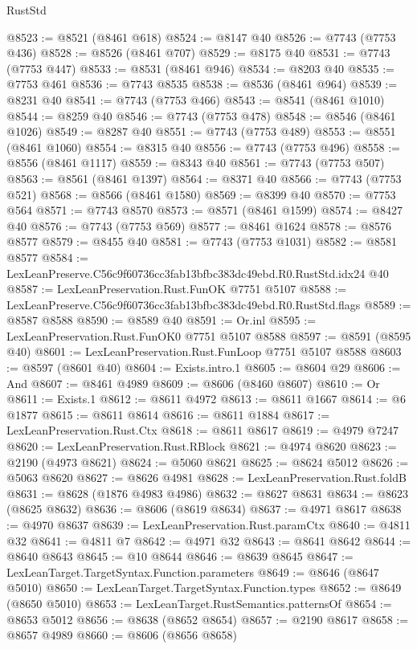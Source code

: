 \begin{lexlean}{RustStd}
\begin{coremodule}
@8523 := @8521 (@8461 @618)
@8524 := @8147 @40
@8526 := @7743 (@7753 @436)
@8528 := @8526 (@8461 @707)
@8529 := @8175 @40
@8531 := @7743 (@7753 @447)
@8533 := @8531 (@8461 @946)
@8534 := @8203 @40
@8535 := @7753 @461
@8536 := @7743 @8535
@8538 := @8536 (@8461 @964)
@8539 := @8231 @40
@8541 := @7743 (@7753 @466)
@8543 := @8541 (@8461 @1010)
@8544 := @8259 @40
@8546 := @7743 (@7753 @478)
@8548 := @8546 (@8461 @1026)
@8549 := @8287 @40
@8551 := @7743 (@7753 @489)
@8553 := @8551 (@8461 @1060)
@8554 := @8315 @40
@8556 := @7743 (@7753 @496)
@8558 := @8556 (@8461 @1117)
@8559 := @8343 @40
@8561 := @7743 (@7753 @507)
@8563 := @8561 (@8461 @1397)
@8564 := @8371 @40
@8566 := @7743 (@7753 @521)
@8568 := @8566 (@8461 @1580)
@8569 := @8399 @40
@8570 := @7753 @564
@8571 := @7743 @8570
@8573 := @8571 (@8461 @1599)
@8574 := @8427 @40
@8576 := @7743 (@7753 @569)
@8577 := @8461 @1624
@8578 := @8576 @8577
@8579 := @8455 @40
@8581 := @7743 (@7753 @1031)
@8582 := @8581 @8577
@8584 := LexLeanPreserve.C56c9f60736cc3fab13bfbc383dc49ebd.R0.RustStd.idx24 @40
@8587 := LexLeanPreservation.Rust.FunOK @7751 @5107
@8588 := LexLeanPreserve.C56c9f60736cc3fab13bfbc383dc49ebd.R0.RustStd.flags
@8589 := @8587 @8588
@8590 := @8589 @40
@8591 := Or.inl
@8595 := LexLeanPreservation.Rust.FunOK0 @7751 @5107 @8588
@8597 := @8591 (@8595 @40)
@8601 := LexLeanPreservation.Rust.FunLoop @7751 @5107 @8588
@8603 := @8597 (@8601 @40)
@8604 := Exists.intro.{1}
@8605 := @8604 @29
@8606 := And
@8607 := @8461 @4989
@8609 := @8606 (@8460 @8607)
@8610 := Or
@8611 := Exists.{1}
@8612 := @8611 @4972
@8613 := @8611 @1667
@8614 := @6 @1877
@8615 := @8611 @8614
@8616 := @8611 @1884
@8617 := LexLeanPreservation.Rust.Ctx
@8618 := @8611 @8617
@8619 := @4979 @7247
@8620 := LexLeanPreservation.Rust.RBlock
@8621 := @4974 @8620
@8623 := @2190 (@4973 @8621)
@8624 := @5060 @8621
@8625 := @8624 @5012
@8626 := @5063 @8620
@8627 := @8626 @4981
@8628 := LexLeanPreservation.Rust.foldB
@8631 := @8628 (@1876 @4983 @4986)
@8632 := @8627 @8631
@8634 := @8623 (@8625 @8632)
@8636 := @8606 (@8619 @8634)
@8637 := @4971 @8617
@8638 := @4970 @8637
@8639 := LexLeanPreservation.Rust.paramCtx
@8640 := @4811 @32
@8641 := @4811 @7
@8642 := @4971 @32
@8643 := @8641 @8642
@8644 := @8640 @8643
@8645 := @10 @8644
@8646 := @8639 @8645
@8647 := LexLeanTarget.TargetSyntax.Function.parameters
@8649 := @8646 (@8647 @5010)
@8650 := LexLeanTarget.TargetSyntax.Function.types
@8652 := @8649 (@8650 @5010)
@8653 := LexLeanTarget.RustSemantics.patternsOf
@8654 := @8653 @5012
@8656 := @8638 (@8652 @8654)
@8657 := @2190 @8617
@8658 := @8657 @4989
@8660 := @8606 (@8656 @8658)

\end{coremodule}
\end{lexlean}
